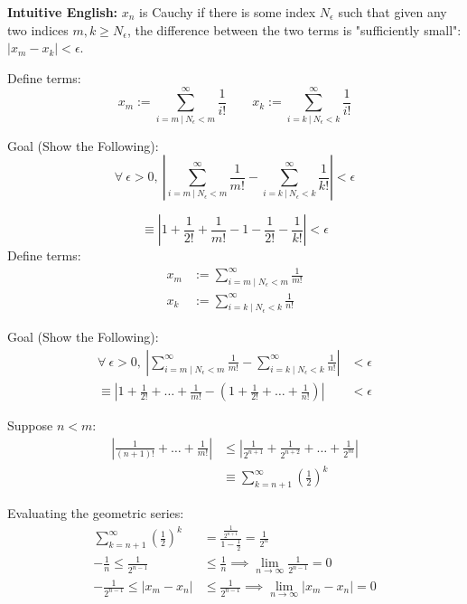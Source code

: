 
\textbf{Intuitive English:} $x_n$ is Cauchy if there is some index $N_\epsilon$ such that given any two indices $m, k \geq N_\epsilon$, the difference between the two terms is "sufficiently small": $|x_m - x_k| < \epsilon$.

	Define terms:
	\[
		x_m := \sum_{i=m ~|~ N_\epsilon < m}^{\infty} \frac{1}{i!}
		\quad \quad
		x_k := \sum_{i=k ~|~ N_\epsilon < k}^{\infty} \frac{1}{i!}
	\]

	Goal (Show the Following):
	\[
		\forall~ \epsilon > 0,~
		\left|
		\sum_{i=m ~|~ N_\epsilon < m}^{\infty} \frac{1}{m!} -
		\sum_{i=k ~|~ N_\epsilon < k}^{\infty} \frac{1}{k!}
		\right| < \epsilon
	\]

	\[
		\equiv
		\left|
		1 + \frac{1}{2!} + \frac{1}{m!}
		-1 - \frac{1}{2!} - \frac{1}{k!}
		\right| < \epsilon
	\]
	Define terms:
	\begin{align*}
		x_m & := \sum_{i=m \mid N_\epsilon < m}^{\infty} \frac{1}{m!} \\
		x_k & := \sum_{i=k \mid N_\epsilon < k}^{\infty} \frac{1}{n!}
	\end{align*}

	Goal (Show the Following):
	\begin{align*}
		\forall~ \epsilon > 0,~
		\left| \sum_{i=m \mid N_\epsilon < m}^{\infty} \frac{1}{m!} - \sum_{i=k \mid N_\epsilon < k}^{\infty} \frac{1}{n!} \right| & < \epsilon \\
		\equiv \left| 1 + \frac{1}{2!} + \dots + \frac{1}{m!} - \left( 1 + \frac{1}{2!} + \dots + \frac{1}{n!} \right) \right|     & < \epsilon
	\end{align*}

	Suppose $n<m$:
	\begin{align*}
		\left| \frac{1}{(n+1)!} + \dots + \frac{1}{m!} \right| & \leq \left| \frac{1}{2^{n+1}} + \frac{1}{2^{n+2}} + \dots + \frac{1}{2^{m}} \right| \\
		                                                       & \equiv \sum_{k=n+1}^{\infty} \left( \frac{1}{2} \right)^k
	\end{align*}

	Evaluating the geometric series:
	\begin{align*}
		\sum_{k=n+1}^{\infty} \left( \frac{1}{2} \right)^k & = \frac{\frac{1}{2^{n+1}}}{1-\frac{1}{2}} = \frac{1}{2^n}           \\
		-\frac{1}{n} \leq \frac{1}{2^{n-1}}                & \leq \frac{1}{n} \implies \lim_{n \to \infty} \frac{1}{2^{n-1}} = 0 \\
		-\frac{1}{2^{n-1}} \leq |x_m - x_n|                & \leq \frac{1}{2^{n-1}} \implies \lim_{n \to \infty} |x_m - x_n| = 0
	\end{align*}

